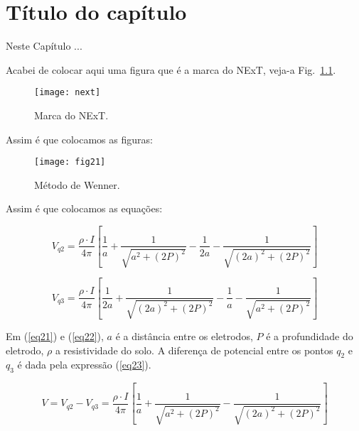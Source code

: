 
\chapter{Título do capítulo}
\label{cap:capitulo-2}

Neste Capítulo ...

Acabei de colocar aqui uma figura que é a marca do NExT, veja-a Fig.~\ref{fig:next}.

\begin{figure}[h!]
  \begin{center}
    \texttt{[image: next]}
    \caption{Marca do NExT.}
    \label{fig:next}
  \end{center}
\end{figure}

Assim é que colocamos as figuras:

\begin{figure}[h!]
  \begin{center}
    \texttt{[image: fig21]}
    \caption{Método de  Wenner.}
    \label{fig:metodo-wener}
  \end{center}
\end{figure}



Assim é que colocamos as equações:

\begin{equation}
  V_{q2} = \frac{\rho \cdot I}{4\pi}\left[\frac{1}{a} + \frac{1}{\sqrt{a^2 + (2P)^2}} - \frac{1}{2a} - \frac{1}{\sqrt{(2a)^2 + (2P)^2}}\right]
  \label{eq21}
\end{equation}

\begin{equation}
  V_{q3} = \frac{\rho \cdot I}{4\pi}\left[\frac{1}{2a} + \frac{1}{\sqrt{(2a)^2 + (2P)^2}} - \frac{1}{a} - \frac{1}{\sqrt{a^2 + (2P)^2}}\right]
  \label{eq22}
\end{equation}

Em (\ref{eq21}) e (\ref{eq22}), $a$ é a distância entre os  eletrodos, $P$ é a profundidade do eletrodo, $\rho$ a resistividade do solo. A diferença de potencial entre os pontos $q_2$ e $q_3$ é dada pela expressão (\ref{eq23}).

\begin{equation}
  V=V_{q2} - V_{q3} = \frac{\rho \cdot I}{4\pi}\left[\frac{1}{a} + \frac{1}{\sqrt{a^2 + (2P)^2}} - \frac{1}{\sqrt{(2a)^2 + (2P)^2}}\right]
  \label{eq23}
\end{equation}

